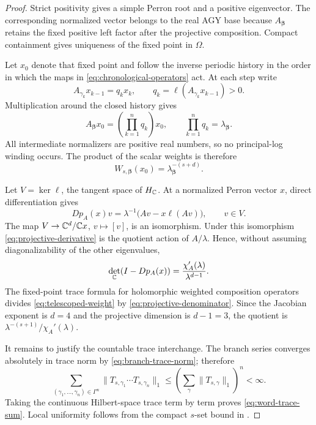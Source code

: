 \begin{proof}
Strict positivity gives a simple Perron root and a positive eigenvector.
The corresponding normalized vector belongs to the real AGY base because
\(A_{\boldsymbol\beta}\) retains the fixed positive left factor after the
projective composition.  Compact containment gives uniqueness of the fixed
point in \(\Omega\).

Let \(x_0\) denote that fixed point and follow the inverse periodic history
in the order in which the maps in \eqref{eq:chronological-operators} act.
At each step write
\[
 A_{\gamma_k}x_{k-1}=q_kx_k,
 \qquad q_k=\ell(A_{\gamma_k}x_{k-1})>0.
\]
Multiplication around the closed history gives
\[
 A_{\boldsymbol\beta}x_0
 =\left(\prod_{k=1}^nq_k\right)x_0,
 \qquad
 \prod_{k=1}^nq_k=\lambda_{\boldsymbol\beta}.
\]
All intermediate normalizers are positive real numbers, so no principal-log
winding occurs.  The product of the scalar weights is therefore
\begin{equation}
 W_{s,\boldsymbol\beta}(x_0)
 =\lambda_{\boldsymbol\beta}^{-(s+d)}.
 \label{eq:telescoped-weight}
\end{equation}

Let \(V=\ker\ell\), the tangent space of \(H_{\mathbb{C}}\).  At a normalized Perron
vector \(x\), direct differentiation gives
\begin{equation}
 Dp_A(x)v
 =\lambda^{-1}\bigl(Av-x\ell(Av)\bigr),
 \qquad v\in V.
 \label{eq:projective-derivative}
\end{equation}
The map \(V\to\mathbb{C}^d/\mathbb{C} x\), \(v\mapsto[v]\), is an isomorphism.  Under this
isomorphism \eqref{eq:projective-derivative} is the quotient action of
\(A/\lambda\).  Hence, without assuming diagonalizability of the other
eigenvalues,
\begin{equation}
 \det_{\mathbb{C}}(I-Dp_A(x))
 =\frac{\chi_A'(\lambda)}{\lambda^{d-1}}.
 \label{eq:projective-denominator}
\end{equation}
The fixed-point trace formula for holomorphic weighted composition
operators~\citep{bandtlow2008ruelle,bandtlow2008explicit} divides
\eqref{eq:telescoped-weight} by
\eqref{eq:projective-denominator}.  Since the Jacobian exponent is \(d=4\)
and the projective dimension is \(d-1=3\), the quotient is
\(\lambda^{-(s+1)}/\chi_A'(\lambda)\).

It remains to justify the countable trace interchange.  The branch series
converges absolutely in trace norm by \eqref{eq:branch-trace-norm}; therefore
\[
 \sum_{(\gamma_1,\ldots,\gamma_n)\in\Gamma^n}
 \|T_{s,\gamma_1}\cdots T_{s,\gamma_n}\|_1
 \leq
 \left(\sum_\gamma\|T_{s,\gamma}\|_1\right)^n<\infty.
\]
Taking the continuous Hilbert-space trace term by term proves
\eqref{eq:word-trace-sum}.  Local uniformity follows from the compact
\(s\)-set bound in .
\end{proof}

